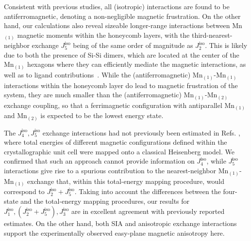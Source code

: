 \documentclass[preprint,amsmath,amssymb,aps,nofootinbib,superscriptaddress]{revtex4-2}
\begin{document}
 Consistent with previous studies\cite{PRB2017May,Nature2021Seo}, all (isotropic) interactions are found to be antiferromagnetic, denoting a non-negligible magnetic frustration. On the other hand, our calculations also reveal sizeable longer-range interactions between Mn$_{(1)}$ magnetic moments within the honeycomb layers, with the third-nearest-neighbor exchange $J^{\mathrm{iso}}_5$ being of the same order of magnitude as $J_2^{\mathrm{iso}}$. This is likely due to both the presence of Si-Si dimers, which are located at the center of the Mn$_{(1)}$ hexagons where they can efficiently mediate the magnetic interactions, as well as to ligand contributions~\cite{PRB2022Riedl}.  While the (antiferromagnetic) Mn$_{(1)}$-Mn$_{(1)}$ interactions within the honeycomb layer do lead to magnetic frustration of the system, they are much smaller than the (antiferromagnetic) Mn$_{(1)}$-Mn$_{(2)}$ exchange coupling, so that a ferrimagnetic configuration with antiparallel Mn$_{(1)}$ and Mn$_{(2)}$ is expected to be the lowest energy state. 

The $J^{\mathrm{iso}}_4, J^{\mathrm{iso}}_5$ exchange interactions had not previously been estimated in Refs. \cite{PRB2017May,Nature2021Seo}, where total energies of different magnetic configurations defined within the crystallographic unit cell were mapped onto a classical Heisenberg model. We confirmed that such an approach cannot provide information on $J^{\mathrm{iso}}_4$, while $J^{\mathrm{iso}}_5$ interactions give rise to a spurious contribution to the nearest-neighbor Mn$_{(1)}$-Mn$_{(1)}$ exchange that, within this total-energy mapping procedure, would correspond to $J^{\mathrm{iso}}_2+J^{\mathrm{iso}}_5$. Taking into account the differences between the four-state and the total-energy mapping procedures, our results for $J^{\mathrm{iso}}_1, (J^{\mathrm{iso}}_2+J^{\mathrm{iso}}_5),J^{\mathrm{iso}}_3$ are in excellent agreement with previously reported estimates\cite{Nature2021Seo}. On the other hand, both SIA and anisotropic exchange interactions support the experimentally observed easy-plane magnetic anisotropy here. 
\end{document}
